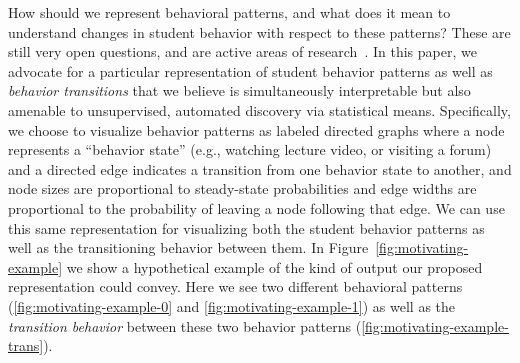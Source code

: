 How should we represent behavioral patterns, and what does it mean to
understand changes in student behavior with respect to these patterns?
These are still very open questions, and are active areas of
research~\cite{Kizilcec:2013:LAK, Faucon:2016:EDM, Davis:2016:EDM,
Shih:2010:EDM}. In this paper, we advocate for a particular representation
of student behavior patterns as well as \emph{behavior transitions} that we
believe is simultaneously interpretable but also amenable to unsupervised,
automated discovery via statistical means. Specifically, we choose to
visualize behavior patterns as labeled directed graphs where a node represents a ``behavior state'' (e.g., watching lecture video, or visiting a forum) and a directed edge indicates a transition from one behavior state to another, and node sizes are
proportional to steady-state probabilities and edge widths are proportional
to the probability of leaving a node following that edge. We can use this
same representation for visualizing both the student behavior patterns as
well as the transitioning behavior between them. In
Figure~\ref{fig:motivating-example} we show a hypothetical example of the
kind of output our proposed representation could convey. Here we see two
different behavioral patterns (\ref{fig:motivating-example-0} and
\ref{fig:motivating-example-1}) as well as the \emph{transition behavior}
between these two behavior patterns (\ref{fig:motivating-example-trans}).
